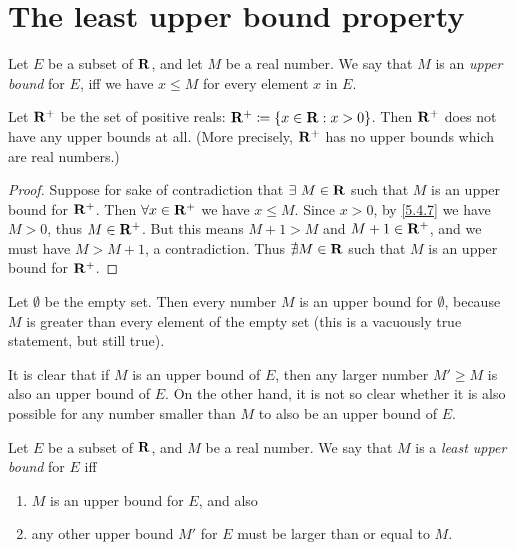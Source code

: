 \section{The least upper bound property}\label{sec 5.5}

\begin{definition}\label{5.5.1}
  Let \(E\) be a subset of \(\mathbf{R}\), and let \(M\) be a real number.
  We say that \(M\) is an \emph{upper bound} for \(E\), iff we have \(x \leq M\) for every element \(x\) in \(E\).
\end{definition}

\setcounter{theorem}{2}
\begin{example}\label{5.5.3}
  Let \(\mathbf{R}^+\) be the set of positive reals: \(\mathbf{R}^+ \coloneqq \{x \in \mathbf{R} : x > 0\}\).
  Then \(\mathbf{R}^+\) does not have any upper bounds at all.
  (More precisely, \(\mathbf{R}^+\) has no upper bounds which are real numbers.)
\end{example}

\begin{proof}
  Suppose for sake of contradiction that \(\exists\ M \in \mathbf{R}\) such that \(M\) is an upper bound for \(\mathbf{R}^+\).
  Then \(\forall x \in \mathbf{R}^+\) we have \(x \leq M\).
  Since \(x > 0\), by \cref{5.4.7} we have \(M > 0\), thus \(M \in \mathbf{R}^+\).
  But this means \(M + 1 > M\) and \(M + 1 \in \mathbf{R}^+\), and we must have \(M > M + 1\), a contradiction.
  Thus \(\nexists M \in \mathbf{R}\) such that \(M\) is an upper bound for \(\mathbf{R}^+\).
\end{proof}

\begin{example}\label{5.5.4}
  Let \(\emptyset\) be the empty set.
  Then every number \(M\) is an upper bound for \(\emptyset\), because \(M\) is greater than every element of the empty set
  (this is a vacuously true statement, but still true).
\end{example}

\begin{note}
  It is clear that if \(M\) is an upper bound of \(E\), then any larger number \(M' \geq M\) is also an upper bound of \(E\).
  On the other hand, it is not so clear whether it is also possible for any number smaller than \(M\) to also be an upper bound of \(E\).
\end{note}

\begin{definition}\label{5.5.5}
  Let \(E\) be a subset of \(\mathbf{R}\), and \(M\) be a real number.
  We say that \(M\) is a \emph{least upper bound} for \(E\) iff
  \begin{enumerate}
    \item \(M\) is an upper bound for \(E\), and also
    \item any other upper bound \(M'\) for \(E\) must be larger than or equal to \(M\).
  \end{enumerate}
\end{definition}

